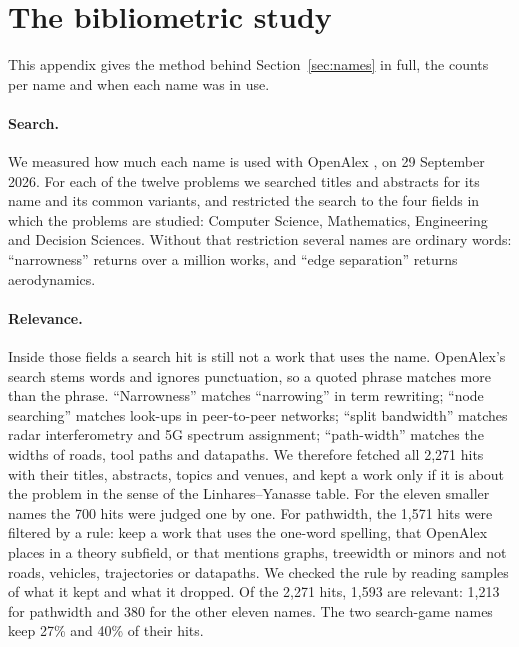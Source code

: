 \section{The bibliometric study}
\label{app:names}

This appendix gives the method behind Section~\ref{sec:names} in full, the
counts per name and when each name was in use.

\paragraph{Search.} We measured how much each name is used with OpenAlex
\citep{Priem2022}, on 29 September 2026. For each of the twelve problems we
searched titles and abstracts for its name and its common variants, and
restricted the search to the four fields in which the problems are studied:
Computer Science, Mathematics, Engineering and Decision Sciences. Without that
restriction several names are ordinary words: ``narrowness'' returns over a
million works, and ``edge separation'' returns aerodynamics.

\paragraph{Relevance.} Inside those fields a search hit is still not a work that
uses the name. OpenAlex's search stems words and ignores punctuation, so a
quoted phrase matches more than the phrase. ``Narrowness'' matches
``narrowing'' in term rewriting; ``node searching'' matches look-ups in
peer-to-peer networks; ``split bandwidth'' matches radar interferometry and 5G
spectrum assignment; ``path-width'' matches the widths of roads, tool paths and
datapaths. We therefore fetched all 2,271 hits with their titles, abstracts,
topics and venues, and kept a work only if it is about the problem in the sense
of the Linhares--Yanasse table. For the eleven smaller names the 700 hits were
judged one by one. For pathwidth, the 1,571 hits were filtered by a rule: keep a
work that uses the one-word spelling, that OpenAlex places in a theory subfield,
or that mentions graphs, treewidth or minors and not roads, vehicles,
trajectories or datapaths. We checked the rule by reading samples of what it
kept and what it dropped. Of the 2,271 hits, 1,593 are relevant: 1,213 for
pathwidth and 380 for the other eleven names. The two search-game names keep
27\% and 40\% of their hits.

